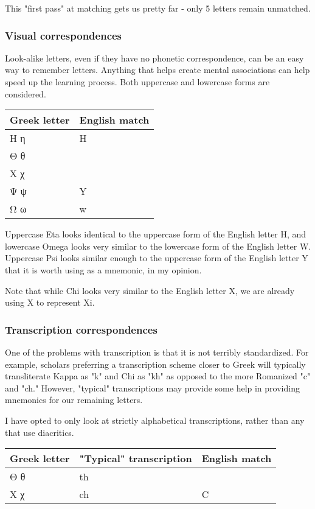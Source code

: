 \documentclass[11pt]{article}
\begin{document}
This "first pass" at matching gets us pretty far - only 5 letters remain unmatched.

\subsubsection{Visual correspondences}
\label{sec:orgdcada05}

Look-alike letters, even if they have no phonetic correspondence, can be an easy way to remember letters. Anything that helps create mental associations can help speed up the learning process. Both uppercase and lowercase forms are considered.

\begin{center}
\begin{tabular}{ll}
Greek letter & English match\\
\hline
Η η & H\\
Θ θ & \\
Χ χ & \\
Ψ ψ & Y\\
Ω ω & w\\
\end{tabular}
\end{center}

Uppercase Eta looks identical to the uppercase form of the English letter H, and lowercase Omega looks very similar to the lowercase form of the English letter W. Uppercase Psi looks similar enough to the uppercase form of the English letter Y that it is worth using as a mnemonic, in my opinion.

Note that while Chi looks very similar to the English letter X, we are already using X to represent Xi.

\subsubsection{Transcription correspondences}
\label{sec:org0ac28db}

One of the problems with transcription is that it is not terribly standardized. For example, scholars preferring a transcription scheme closer to Greek will typically transliterate Kappa as "k" and Chi as "kh" as opposed to the more Romanized "c" and "ch." However, "typical" transcriptions may provide some help in providing mnemonics for our remaining letters.

I have opted to only look at strictly alphabetical transcriptions, rather than any that use diacritics. 

\begin{center}
\begin{tabular}{lll}
Greek letter & "Typical" transcription & English match\\
\hline
Θ θ & th & \\
Χ χ & ch & C\\
\end{tabular}
\end{center}
\end{document}

